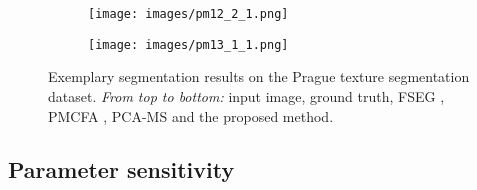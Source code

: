 \documentclass[journal]{IEEEtran}
\begin{document}
\begin{figure*}
    \hfill
    \begin{subfigure}[b]{0.16\textwidth}
        \texttt{[image: images/pm12\_2\_1.png]}
    \end{subfigure}
    \hfill
    \begin{subfigure}[b]{0.16\textwidth}
        \texttt{[image: images/pm13\_1\_1.png]}
    \end{subfigure}
    \caption{Exemplary segmentation results on the Prague texture segmentation dataset. \emph{From top to bottom:} input image, ground truth, FSEG \cite{yuan2015factorization}, PMCFA \cite{panagiotakis2011,panagiotakis2011slides}, PCA-MS \cite{mevenkamp2016} and the proposed method.}
    \label{fig:icpr2014_visual_results}
\end{figure*}





\subsection{Parameter sensitivity}
\end{document}
